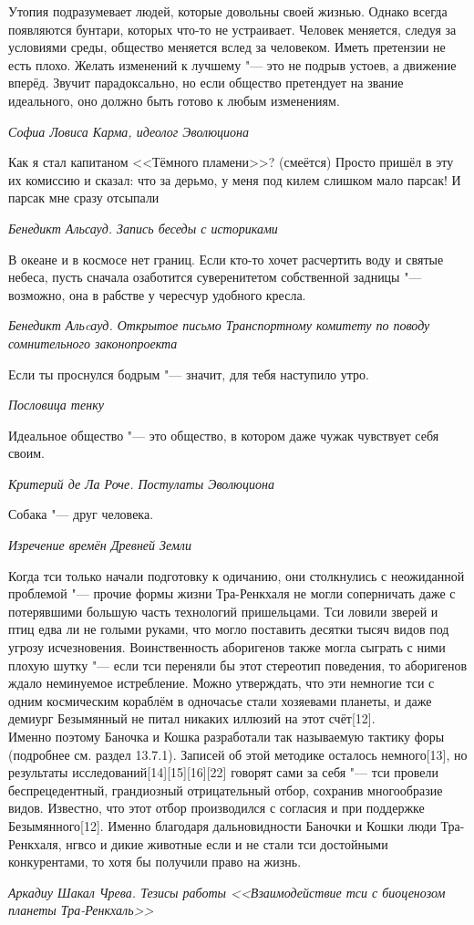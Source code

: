 \documentclass[a4paper,10pt]{book}
\newcommand{\ldotst}{\so{...}\xspace}
\begin{document}
\epigraph{Утопия подразумевает людей, которые довольны своей жизнью. Однако 
всегда появляются бунтари, которых что-то не устраивает. Человек меняется, 
следуя за условиями среды, общество меняется вслед за человеком. Иметь 
претензии не есть плохо. Желать изменений к лучшему "--- это не подрыв устоев, 
а движение вперёд. Звучит парадоксально, но если общество претендует на 
звание идеального, оно должно быть готово к любым изменениям.}
{\textit{Софиа Ловиса Карма, идеолог Эволюциона}}

\epigraph{Как я стал капитаном <<Тёмного пламени>>? (смеётся) Просто пришёл в 
эту их 
комиссию и сказал: что за дерьмо, у меня под килем слишком мало парсак! И 
парсак мне сразу отсыпали\ldotst}
{\textit{Бенедикт Альсауд. Запись беседы с историками}}

\epigraph{В океане и в космосе нет границ. Если кто-то хочет расчертить воду и 
святые 
небеса, 
пусть сначала озаботится суверенитетом собственной задницы "--- возможно, она в
рабстве у чересчур удобного кресла.}
{\textit{Бенедикт Альcауд. Открытое письмо Транспортному комитету 
по поводу сомнительного законопроекта}}

\epigraph{Если ты проснулся бодрым "--- значит, для тебя наступило утро.}
{\textit{Пословица тенку}}

\epigraph{Идеальное общество "--- это общество, в котором даже чужак чувствует 
себя своим.}
{\textit{Критерий де Ла Роче. Постулаты Эволюциона}}

\epigraph{Собака "--- друг человека.}
{\textit{Изречение времён Древней Земли}}

\epigraph{Когда тси только начали подготовку к одичанию, они столкнулись с 
неожиданной 
проблемой "--- прочие формы жизни Тра-Ренкхаля не могли соперничать даже с 
потерявшими большую часть технологий пришельцами. Тси ловили зверей и птиц едва 
ли не голыми руками, что могло поставить десятки тысяч видов под 
угрозу исчезновения. Воинственность аборигенов также могла сыграть с ними 
плохую 
шутку "--- если тси переняли бы этот стереотип поведения, то аборигенов ждало 
неминуемое истребление. Можно утверждать, что эти немногие тси с одним 
космическим кораблём в одночасье стали хозяевами планеты, и даже демиург 
Безымянный не питал никаких иллюзий на этот счёт[12].\\
Именно поэтому Баночка и Кошка разработали так называемую тактику форы 
(подробнее см. раздел 13.7.1). Записей об этой методике осталось немного[13], 
но результаты исследований[14][15][16][22] говорят сами за себя "--- тси 
провели 
беспрецедентный, грандиозный отрицательный отбор, сохранив многообразие видов. 
Известно, что этот отбор производился с согласия и при поддержке 
Безымянного[12]. Именно 
благодаря дальновидности Баночки и Кошки люди Тра-Ренкхаля, нгвсо и дикие 
животные если и не стали тси достойными конкурентами, то хотя бы получили право 
на жизнь.}
{\textit{Аркадиу Шакал Чрева. Тезисы работы <<Взаимодействие тси с биоценозом 
планеты Тра-Ренкхаль>>}}
\end{document}
